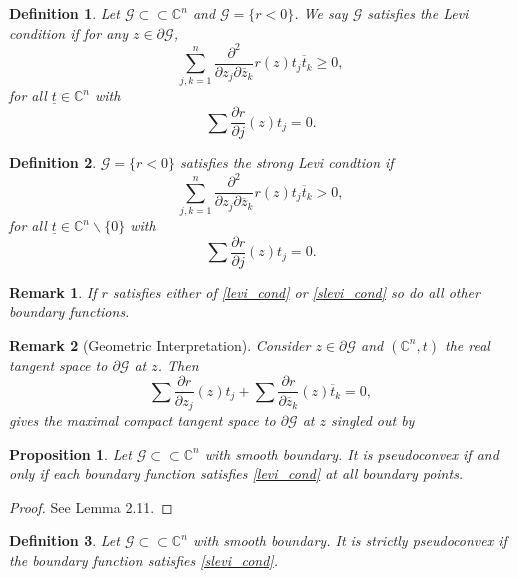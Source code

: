 \documentclass{article}
\newtheorem{proposition}{Proposition}[section]
\newtheorem{definition}{Definition}[section]
\newtheorem{remark}{Remark}[section]
\newcommand{\C}[0]{\mathbb{C}}
\newcommand{\G}[0]{\mathcal{G}}
\newcommand{\pd}[2]{{\frac {\partial#1} {\partial#2}}}
\newcommand{\bd}[0]{\partial}
\newcommand{\compembed}[0]{\subset\subset}
\newcommand{\secconjder}[2]{{\frac {\partial^2} {\partial z_{#1}\partial \overline{z}_{#2}}}}
\begin{document}
\begin{definition}
  Let $\G\compembed\C^n$ and $\G=\{r<0\}$. We say $\G$ satisfies the Levi condition if for any $z\in\bd\G$,
  \begin{equation*}
    \sum_{j,k=1}^n \secconjder{j}{k}r(z)t_j\overline{t}_k\geq0,\tag{L}\label{levi_cond}
  \end{equation*}
  for all $\underline{t}\in\C^n$ with 
  \begin{equation*}
    \sum \pd{r}{j}(z)t_j=0.
  \end{equation*}
\end{definition}

\begin{definition}
  $\G=\{r<0\}$ satisfies the strong Levi condtion if 
  \begin{equation*}
    \sum_{j,k=1}^n \secconjder{j}{k}r(z)t_j\overline{t}_k>0,\tag{SL}\label{slevi_cond}
  \end{equation*}
  for all $\underline{t}\in\C^n\backslash\{0\}$ with 
  \begin{equation*}
    \sum \pd{r}{j}(z)t_j=0.
  \end{equation*}
\end{definition}

\begin{remark}
  If $r$ satisfies either of \eqref{levi_cond} or \eqref{slevi_cond} so do all other boundary functions.
\end{remark}

\begin{remark}[Geometric Interpretation]
  Consider $z\in\bd\G$ and $(\C^n,t)$ the real tangent space to $\bd\G$ at $z$. Then 
  \begin{equation*}
    \sum \pd{r}{z_j}(z)t_j+ \sum \pd{r}{\overline{z}_k}(z)\overline{t}_k = 0,
  \end{equation*}
  gives the maximal compact tangent space to $\bd\G$ at $z$ singled out by 
\end{remark}

\begin{proposition}
  Let $\G\compembed\C^n$ with smooth boundary. It is pseudoconvex if and only if each boundary function satisfies \eqref{levi_cond} at all boundary points.
\end{proposition}

\begin{proof}
See \cite{Ra} Lemma 2.11.
\end{proof}

\begin{definition}
  Let $\G\compembed\C^n$ with smooth boundary. It is strictly pseudoconvex if the boundary function satisfies \eqref{slevi_cond}.
\end{definition}
\end{document}
